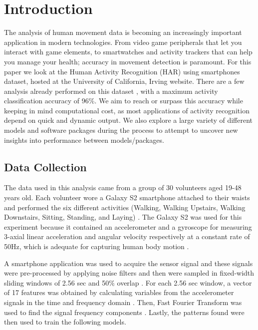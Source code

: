 \documentclass[12pt]{article}
\begin{document}
\section*{Introduction}

The analysis of human movement data is becoming an increasingly important application in modern technologies. From video game peripherals that let you interact with game elements, to smartwatches and activity trackers that can help you manage your health; accuracy in movement detection is paramount. For this paper we look at the Human Activity Recognition (HAR) using smartphones dataset, hosted at the University of California, Irving website. There are a few analysis already performed on this dataset \cite{anguita2012human}, with a maximum activity classification accuracy of 96\%. We aim to reach or surpass this accuracy while keeping in mind computational cost, as most applications of activity recognition depend on quick and dynamic output. We also explore a large variety of different models and software packages during the process to attempt to uncover new insights into performance between models/packages.

\subsection{Data Collection}
The data used in this analysis came from a group of 30 volunteers aged 19-48 years old. Each volunteer wore a Galaxy S2 smartphone attached to their waists and performed the six different activities (Walking, Walking Upstairs, Walking Downstairs, Sitting, Standing, and Laying) \cite{anguita2012human}. The Galaxy S2 was used for this experiment because it contained an accelerometer and a gyroscope for measuring 3-axial linear acceleration and angular velocity respectively at a constant rate of 50Hz, which is adequate for capturing human body motion \cite{anguita2012human}. 
    
A smartphone application was used to acquire the sensor signal and these signals were pre-processed by applying noise filters and then were sampled in fixed-width sliding windows of 2.56 sec and 50\% overlap \cite{anguita2012human}. For each 2.56 sec window, a vector of 17 features was obtained by calculating variables from the accelerometer signals in the time and frequency domain \cite{anguita2012human}. Then, Fast Fourier Transform was used to find the signal frequency components \cite{anguita2012human}. Lastly, the patterns found were then used to train the following models.
\end{document}
